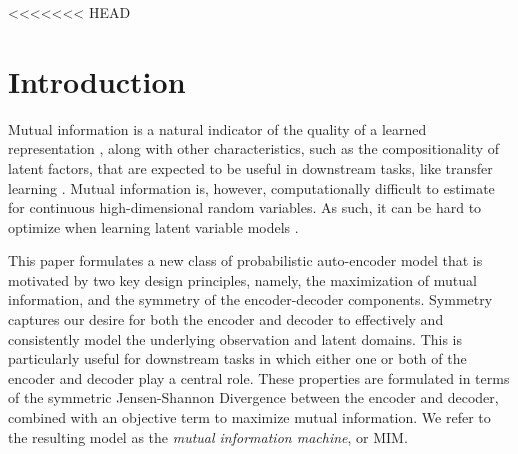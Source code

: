 <<<<<<< HEAD

\section{Introduction} \label{sec:introduction}

Mutual information is a natural indicator of the quality of a learned representation
\citep{hjelm2018learning}, along with other characteristics, such as the compositionality of
latent factors, that are expected to be useful in downstream tasks, like transfer 
learning \citep{DBLP:journals/corr/BengioTPPB17}.
Mutual information is, however, computationally difficult to estimate for continuous
high-dimensional random variables.  As such, it can be hard to optimize when learning
latent variable models \citep{Hjelm2018,Chen2016}.


This paper formulates a new class of probabilistic auto-encoder model
that is motivated by two key design principles, namely, the maximization
of mutual information, and the symmetry of the encoder-decoder components.
Symmetry captures our desire for both the encoder and decoder to effectively
and consistently model the underlying observation and latent domains.
This is particularly useful for downstream tasks in which either one
or both of the encoder and decoder play a central role.
These properties are formulated in terms of the symmetric Jensen-Shannon
Divergence between the encoder and decoder, combined with an objective term
to maximize mutual information.  We refer to the resulting model as the
{\em mutual information machine}, or MIM.

